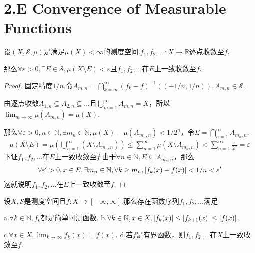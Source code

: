 \section{2.E Convergence of Measurable Functions}

\begin{theorem}[2.85]\label{2.85}
    设\((X, \mathcal{S}, \mu)\)是满足\(\mu(X)<\infty\)的测度空间.\(f_1, f_2, \dots :X \to \mathbb{R}\)逐点收敛至\(f\).

    那么\(\forall \varepsilon>0, \exists E \in \mathcal{S}, \mu(X \setminus E)<\varepsilon\)且\(f_1, f_2, \dots\)在\(E\)上一致收敛至\(f\).
\end{theorem}

\begin{proof}
    固定精度\(1/n\).令\(A_{m,n}=\bigcap_{k=m}^\infty (f_k-f)^{-1}((-1/n,1/n)), A_{m,n} \in \mathcal{S}\).

    由逐点收敛\(A_{1,n} \subseteq A_{2,n} \subseteq \dots\)且\(\bigcup_{m=1}^\infty A_{m,n}=X\)，所以\(\lim_{m \to \infty} \mu(A_{m,n})=\mu(X)\).

    那么\(\forall \varepsilon>0, n \in \mathbb{N}, \exists m_n \in \mathbb{N}, \mu(X)-\mu(A_{m_n,n})<1/2^n\)，令\(E=\bigcap_{n=1}^\infty A_{m_n,n}\).
    \begin{align*}
        \mu(X \setminus E)=\mu \left(\bigcup_{n=1}^\infty (X \setminus A_{m_n,n})\right) 
        \leq \sum_{n=1}^\infty \mu(X \setminus A_{m_n,n})<\sum_{n=1}^\infty \frac{\varepsilon}{2^n}=\varepsilon 
    \end{align*}
    下证\(f_1, f_2, \dots\)在\(E\)上一致收敛至\(f\).由于\(\forall n \in \mathbb{N}, E \subseteq A_{m_n,n}\)，那么
    \begin{align*}
        \forall \varepsilon'>0, x \in E, \exists m_n \in \mathbb{N}, \forall k \geq m_n, \abs*{f_k(x)-f(x)}<1/n<\varepsilon'
    \end{align*}
    这就说明\(f_1, f_2, \dots\)在\(E\)上一致收敛至\(f\).
\end{proof}

\begin{theorem}[2.89]\label{2.89}
    设\(X, \mathcal{S}\)是测度空间且\(f: X \to [-\infty,\infty]\).那么存在函数序列\(f_1, f_2, \dots\)满足

    a.\(\forall k \in \mathbb{N}, f_k\)都是简单可测函数. \quad b.\(\forall k \in \mathbb{N}, x \in X, \abs*{f_k(x)} \leq \abs*{f_{k+1}(x)} \leq \abs*{f(x)}\).

    c.\(\forall x \in X, \lim_{k \to \infty}f_k(x)=f(x)\). \quad d.若\(f\)是有界函数，则\(f_1, f_2, \dots\)在\(X\)上一致收敛至\(f\).
\end{theorem}

